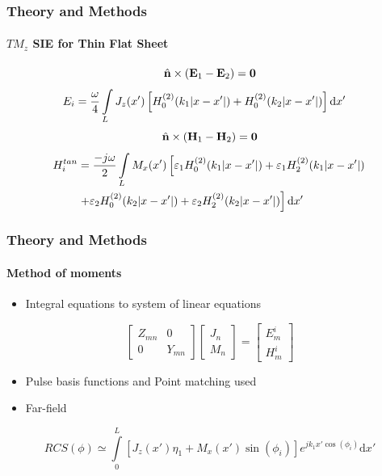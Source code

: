 \documentclass[mathserif,16pt,xcolor=table]{beamer}
\begin{document}
\begin{frame}
  \frametitle{Theory and Methods}
  \framesubtitle{$TM_z$ SIE for Thin Flat Sheet}
  \begin{equation} \nonumber
    \hat{\mathbf{n}} \times (\mathbf{E}_1 - \mathbf{E}_2) = \mathbf{0}
    \label{eq:E1bc}
  \end{equation}
  \begin{align} \nonumber
    E_i ={}& \frac{\omega}{4} \int\limits_L J_z(x') \left[ H_0^{(2)}(k_1 | x -  x'|) + H_0^{(2)}(k_2 |x - x'|)\right] \mathop{}\!\mathrm{d}{x'}  \notag
    \label{eq:scalarE}
  \end{align}
  \begin{equation} \nonumber
    \hat{\mathbf{n}} \times (\mathbf{H}_1 - \mathbf{H}_2) = \mathbf{0}
    \label{eq:E1bc}
  \end{equation}
  \begin{align} \nonumber
    H_i^{tan} &= \frac{-j \omega}{2} \int\limits_L M_x(x') \left[ \varepsilon_1 H_0^{(2)}(k_1 |x - x'|) + \varepsilon_1 H_2^{(2)}(k_1 |x - x'|) \right. \notag\\
    & \left. + \varepsilon_2 H_0^{(2)}(k_2 |x - x'|) + \varepsilon_2 H_2^{(2)}(k_2 |x - x'|)\right] \mathop{}\!\mathrm{d}{x'} \notag
    \label{eq:scalarH}
  \end{align}
\end{frame}
\begin{frame}
  \frametitle{Theory and Methods}
  \framesubtitle{Method of moments}
  \begin{itemize}
    \item {Integral equations to system of linear equations}
  \end{itemize}
  \[
  \begin{bmatrix}
    Z_{mn}   & 0 \\
    0        & Y_{mn}
  \end{bmatrix}
  \begin{bmatrix}
    J_n \\
    M_n
  \end{bmatrix}
  =
  \begin{bmatrix}
    E_m^i \\
    H_m^i
  \end{bmatrix}
  \]
  \begin{itemize}
    \item {Pulse basis functions and Point matching used}
    \item {Far-field}
  \end{itemize}
  \begin{equation} \nonumber
    RCS({\phi}) \simeq \int \limits_{0}^{L} \left[J_z(x')\eta_1 + M_x(x')\sin(\phi_i)\right] e^{j k_1 x' \cos(\phi_i)} \mathrm{d}x'
    \label{eq:far-field}
  \end{equation}
\end{frame}
\end{document}
